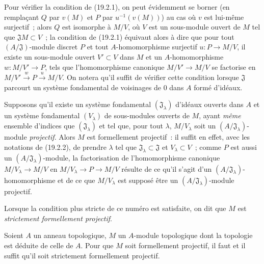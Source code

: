 \begin{env}[19.2.2]
\label{0.19.2.2-fr}
Pour vérifier la condition de (19.2.1), on peut évidemment se borner (en
remplaçant $Q$ par $v(M)$ et $P$ par $u^{-1}(v(M))$) au cas où $v$ est
lui-même surjectif~; alors $Q$ est isomorphe à $M/V$, où $V$ est un
sous-module ouvert de $M$ tel que $\mathfrak JM\subset V$~; la condition de
(19.2.1) équivaut alors à dire que pour tout $(A/\mathfrak J)$-module discret
$P$ et tout $A$-homomorphisme surjectif $u:P\to M/V$, il existe un sous-module
ouvert $V'\subset V$ dans $M$ et un $A$-homomorphisme $w:M/V'\to P$, tels que
l'homomorphisme canonique $M/V'\to M/V$ se factorise en
$M/V'\xrightarrow{w}P\xrightarrow{u}M/V$.
On notera qu'il suffit de vérifier cette condition lorsque $\mathfrak J$
parcourt un système fondamental de voisinages de 0 dans $A$ formé d'idéaux.
\end{env}

\begin{env}[19.2.3]
\label{0.19.2.3-fr}
Supposons qu'il existe un système fondamental $(\mathfrak J_\lambda)$ d'idéaux
ouverts dans $A$ et un système fondamental $(V_\lambda)$ de sous-modules
ouverts de $M$, ayant \emph{même} ensemble d'indices que
$(\mathfrak J_\lambda)$ et tel que, pour tout $\lambda$, $M/V_\lambda$ soit un
$(A/\mathfrak J_\lambda)$-module \emph{projectif}. Alors $M$ est formellement
projectif~: il suffit en effet, avec les notations de (19.2.2), de prendre
$\lambda$ tel que $\mathfrak J_\lambda\subset\mathfrak J$ et
$V_\lambda\subset V$~; comme $P$ est aussi un
$(A/\mathfrak J_\lambda)$-module, la factorisation de l'homomorphisme canonique
$M/V_\lambda\to M/V$ en $M/V_\lambda\to P\to M/V$ résulte de ce qu'il s'agit
d'un $(A/\mathfrak J_\lambda)$-homomorphisme et de ce que $M/V_\lambda$ est
supposé être un $(A/\mathfrak J_\lambda)$-module projectif.

Lorsque la condition plus stricte de ce numéro est satisfaite, on dit que $M$
est \emph{strictement formellement projectif}.
\end{env}

\begin{proposition}[19.2.4]
\label{0.19.2.4-fr}
Soient $A$ un anneau topologique, $M$ un $A$-module topologique dont la
topologie est déduite de celle de $A$. Pour que $M$ soit formellement
projectif, il faut et il suffit qu'il soit strictement formellement projectif.
\end{proposition}


